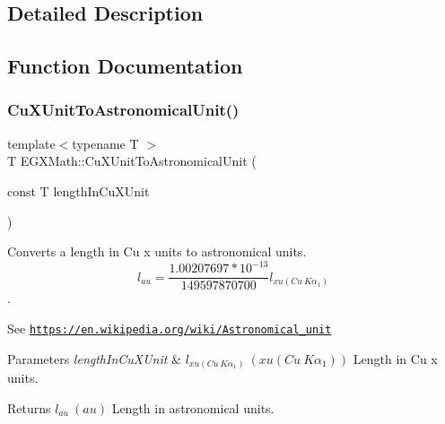 \subsection{Detailed Description}


\subsection{Function Documentation}
\mbox{\label{group___e_g_x_math-_conversions-_length_conversions-_non-_s_i-_cu_x_unit-_astronomical_ga4e500b2f41ef6b9da3270da104a5b6fa}} 
\subsubsection{\texorpdfstring{Cu\+X\+Unit\+To\+Astronomical\+Unit()}{CuXUnitToAstronomicalUnit()}}
{\footnotesize\ttfamily template$<$typename T $>$ \\
T E\+G\+X\+Math\+::\+Cu\+X\+Unit\+To\+Astronomical\+Unit (\begin{DoxyParamCaption}\item[{const T}]{length\+In\+Cu\+X\+Unit }\end{DoxyParamCaption})}



Converts a length in Cu x units to astronomical units. \[ l_{au}= \frac{1.00207697*10^{-13}}{149597870700} l_{xu(Cu\ K\alpha_1)} \]. 

See \href{https://en.wikipedia.org/wiki/Astronomical_unit}{\tt https\+://en.\+wikipedia.\+org/wiki/\+Astronomical\+\_\+unit} 
\begin{DoxyParams}{Parameters}
{\em length\+In\+Cu\+X\+Unit} & $ l_{xu(Cu\ K\alpha_1)}\ (xu(Cu\ K\alpha_1))$ Length in Cu x units. \\
\hline
\end{DoxyParams}
\begin{DoxyReturn}{Returns}
$ l_{au}\ (au)$ Length in astronomical units. 
\end{DoxyReturn}
\mbox{\label{group___e_g_x_math-_conversions-_length_conversions-_non-_s_i-_cu_x_unit-_astronomical_gaf00800997b3a20104d220f4487505cf4}} 
